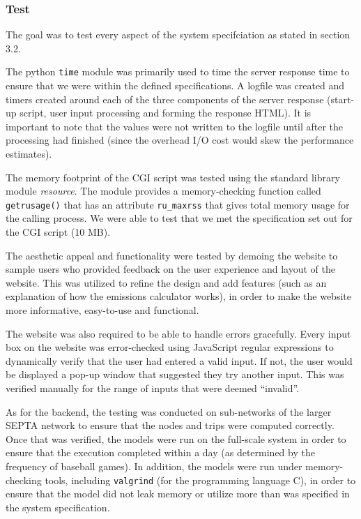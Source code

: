 
\subsubsection{Test}
The goal was to test every aspect of the system specifciation as
stated in section 3.2.

The python \texttt{time} module was primarily used to time the server
response time to ensure that we were within the defined
specifications.  A logfile was created and timers created around each
of the three components of the server response (start-up script, user
input processing and forming the response HTML). It is important to
note that the values were not written to the logfile until after the
processing had finished (since the overhead I/O cost would skew the
performance estimates).

The memory footprint of the CGI script was tested using the standard
library module \emph{resource}. The module provides a memory-checking
function called \texttt{getrusage()} \cite{php-memory} that has an
attribute \verb|ru_maxrss| that gives total memory usage for the
calling process. We were able to test that we met the specification
set out for the CGI script (10 MB).

The aesthetic appeal and functionality were tested by demoing the
website to sample users who provided feedback on the user experience
and layout of the website. This was utilized to refine the design and
add features (such as an explanation of how the emissions calculator
works), in order to make the website more informative, easy-to-use and
functional.

The website was also required to be able to handle errors
gracefully. Every input box on the website was error-checked using
JavaScript regular expressions to dynamically verify that the user had
entered a valid input. If not, the user would be displayed a pop-up
window that suggested they try another input. This was verified
manually for the range of inputs that were deemed ``invalid''.

As for the backend, the testing was conducted on sub-networks of the
larger SEPTA network to ensure that the nodes and trips were computed
correctly. Once that was verified, the models were run on the
full-scale system in order to ensure that the execution completed
within a day (as determined by the frequency of baseball games). In
addition, the models were run under memory-checking tools, including
\texttt{valgrind} (for the programming language C), in order to ensure
that the model did not leak memory or utilize more than was specified
in the system specification.


